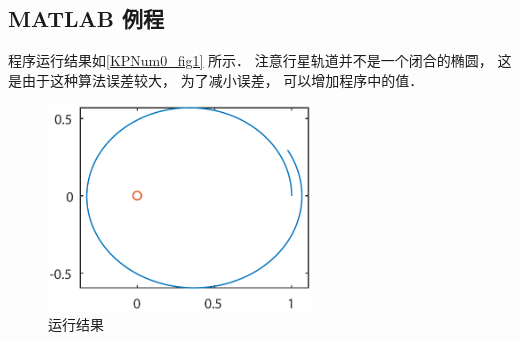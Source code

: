\subsection{MATLAB 例程}



程序运行结果如\autoref{KPNum0_fig1} 所示． 注意行星轨道并不是一个闭合的椭圆， 这是由于这种算法误差较大， 为了减小误差， 可以增加程序中的值．
\begin{figure}[ht]
\centering
\includegraphics[width=7cm]{./figures/KPNum0.pdf}
\caption{运行结果} \label{KPNum0_fig1}
\end{figure}
